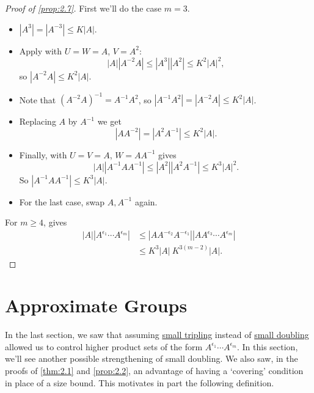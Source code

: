 \documentclass{article}
\numberwithin{equation}{section}
\begin{document}
\begin{proof}[Proof of \cref{prop:2.7}]
  First we'll do the case $m=3$.
  \begin{itemize}
    \item $|A^3| = |A^{-3}| \leq K|A|$.
    \item Apply  with $U=W=A$, $V = A^2$:
      \begin{equation*}
        |A| |A^{-2} A| \leq |A^3| |A^2| \leq K^2 |A|^2,
      \end{equation*}
      so $|A^{-2} A| \leq K^2 |A|$.
    \item Note that $(A^{-2} A)^{-1} = A^{-1} A^2$, so $|A^{-1} A^2| = |A^{-2} A| \leq K^2 |A|$.
    \item Replacing $A$ by $A^{-1}$ we get
      \begin{equation*}
        |A A^{-2}| = |A^2 A^{-1}| \leq K^2 |A|.
      \end{equation*}
    \item Finally,  with $U=V=A$, $W = A A^{-1}$ gives
      \begin{equation*}
        |A| |A^{-1} A A^{-1}| \leq |A^2| |A^2 A^{-1}| \leq K^3 |A|^2.
      \end{equation*}
      So $|A^{-1} A A^{-1}| \leq K^3 |A|$.
    \item For the last case, swap $A,A^{-1}$ again.
  \end{itemize}
  For $m \geq 4$,  gives
  \begin{align*}
    |A| |A^{\epsilon_1} \dotsm A^{\epsilon_m}| &\leq |A A^{-\epsilon_2} A^{-\epsilon_1}| |A A^{\epsilon_3} \dotsm  A^{\epsilon_m}| \\
                                              & \leq K^3 |A|\ K^{3(m-2)} |A|.
  \end{align*}
\end{proof}

\clearpage
\section{Approximate Groups}
In the last section, we saw that assuming \hyperlink{def:tripling}{small tripling} instead of \hyperlink{def:doubling}{small doubling} allowed us to control higher product sets of the form $A^{\epsilon_1} \dotsm A^{\epsilon_m}$.
In this section, we'll see another possible strengthening of small doubling. We also saw, in the proofs of \cref{thm:2.1} and \cref{prop:2.2}, an advantage of having a `covering' condition in place of a size bound. This motivates in part the following definition.
\end{document}
